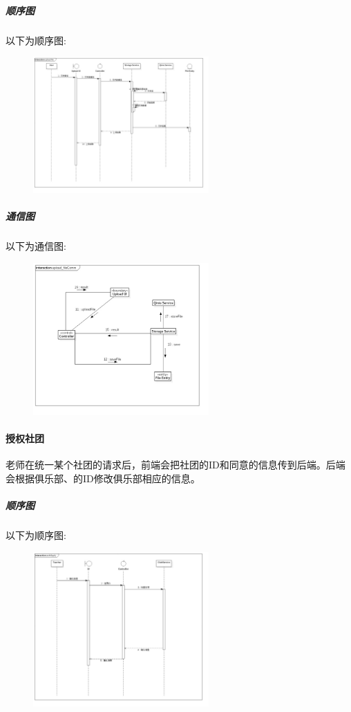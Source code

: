\documentclass[UTF8]{ctexart}
\begin{document}
\subparagraph*{顺序图}
以下为顺序图:\\
\begin{figure}[H]
\centering
\includegraphics[width = 0.6\textwidth]{uploadFileSeq.jpg}
\end{figure}

\subparagraph*{通信图}
以下为通信图:\\
\begin{figure}[H]
\centering
\includegraphics[width = 0.6\textwidth]{uploadFileComm.jpg}
\end{figure}

\paragraph{授权社团}
老师在统一某个社团的请求后，前端会把社团的ID和同意的信息传到后端。后端会根据俱乐部、的ID修改俱乐部相应的信息。

\subparagraph*{顺序图}
以下为顺序图:\\
\begin{figure}[H]
\centering
\includegraphics[width = 0.6\textwidth]{authApplySeq.jpg}
\end{figure}
\end{document}
